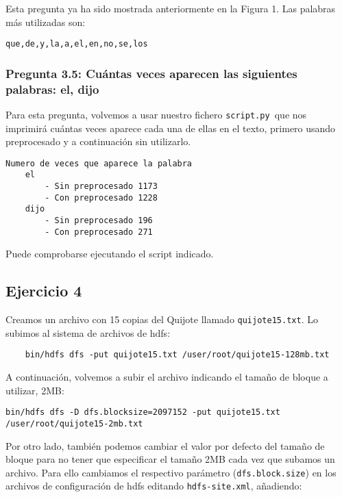 \documentclass[11pt]{article}
\def\inline{\lstinline[basicstyle=\ttfamily,keywordstyle={}]}
\begin{document}
Esta pregunta ya ha sido mostrada anteriormente en la Figura 1. Las palabras más utilizadas son:

\begin{verbatim}
que,de,y,la,a,el,en,no,se,los
\end{verbatim}

\subsubsection*{ Pregunta 3.5:  Cuántas veces aparecen las siguientes palabras: el, dijo }

Para esta pregunta, volvemos a usar nuestro fichero \inline{script.py }que nos imprimirá cuántas veces aparece cada una de ellas en el texto, primero usando preprocesado y a continuación sin utilizarlo.

\begin{verbatim}
Numero de veces que aparece la palabra
    el
        - Sin preprocesado 1173
        - Con preprocesado 1228
    dijo
        - Sin preprocesado 196
        - Con preprocesado 271
\end{verbatim}

Puede comprobarse ejecutando el script indicado.

\subsection{ Ejercicio 4 }

Creamos un archivo con 15 copias del Quijote llamado \inline{quijote15.txt}. Lo subimos al sistema de archivos de hdfs:

\begin{verbatim}
	bin/hdfs dfs -put quijote15.txt /user/root/quijote15-128mb.txt
\end{verbatim}

A continuación, volvemos a subir el archivo indicando el tamaño de bloque a utilizar, 2MB:

\begin{verbatim}
bin/hdfs dfs -D dfs.blocksize=2097152 -put quijote15.txt /user/root/quijote15-2mb.txt
\end{verbatim}

Por otro lado, también podemos cambiar el valor por defecto del tamaño de bloque para no tener que especificar el tamaño 2MB cada vez que subamos un archivo. Para ello cambiamos el respectivo parámetro (\inline{dfs.block.size}) en los archivos de configuración de hdfs editando \inline{hdfs-site.xml}, añadiendo:
\end{document}
